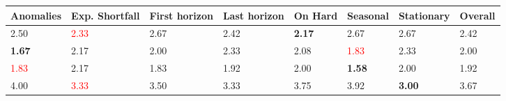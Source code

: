 \begin{tabular}{llllllll}
\toprule
Anomalies & Exp. Shortfall & First horizon & Last horizon & On Hard & Seasonal & Stationary & Overall \\
\midrule
2.50 & \textcolor{red}{2.33} & 2.67 & 2.42 & \textbf{2.17} & 2.67 & 2.67 & 2.42 \\
\textbf{1.67} & 2.17 & 2.00 & 2.33 & 2.08 & \textcolor{red}{1.83} & 2.33 & 2.00 \\
\textcolor{red}{1.83} & 2.17 & 1.83 & 1.92 & 2.00 & \textbf{1.58} & 2.00 & 1.92 \\
4.00 & \textcolor{red}{3.33} & 3.50 & 3.33 & 3.75 & 3.92 & \textbf{3.00} & 3.67 \\
\bottomrule
\end{tabular}
